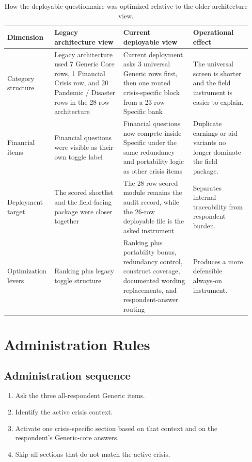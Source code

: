 \documentclass[12pt]{article}
\begin{document}
\begin{table}[H]
\centering
\small
\begin{tabularx}{\textwidth}{L{0.20\textwidth} Y Y Y}
\toprule
Dimension & Legacy architecture view & Current deployable view & Operational effect \\
\midrule
Category structure & Legacy architecture used 7 Generic Core rows, 1 Financial Crisis row, and 20 Pandemic / Disaster rows in the 28-row architecture & Current deployment asks 3 universal Generic rows first, then one routed crisis-specific block from a 23-row Specific bank & The universal screen is shorter and the field instrument is easier to explain. \\
Financial items & Financial questions were visible as their own toggle label & Financial questions now compete inside Specific under the same redundancy and portability logic as other crisis items & Duplicate earnings or aid variants no longer dominate the field package. \\
Deployment target & The scored shortlist and the field-facing package were closer together & The 28-row scored module remains the audit record, while the 26-row deployable file is the asked instrument & Separates internal traceability from respondent burden. \\
Optimization levers & Ranking plus legacy toggle structure & Ranking plus portability bonus, redundancy control, construct coverage, documented wording replacements, and respondent-answer routing & Produces a more defensible always-on instrument. \\
\bottomrule
\end{tabularx}
\caption{How the deployable questionnaire was optimized relative to the older architecture view.}
\end{table}

\section{Administration Rules}

\subsection{Administration sequence}

\begin{enumerate}
\item Ask the three all-respondent Generic items.
\item Identify the active crisis context.
\item Activate one crisis-specific section based on that context and on the respondent's Generic-core answers.
\item Skip all sections that do not match the active crisis.
\end{enumerate}
\end{document}
